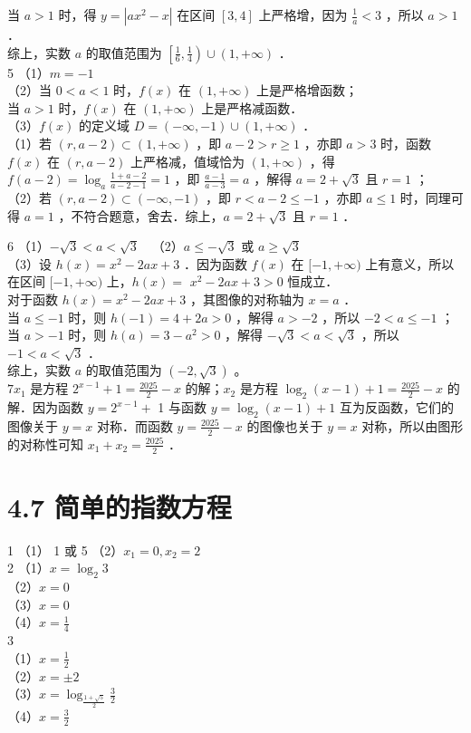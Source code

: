 \documentclass[10pt]{article}
\begin{document}
当 \(a>1\) 时，得 \(y=\left|a x^{2}-x\right|\) 在区间 \([3,4]\) 上严格增，因为 \(\frac{1}{a}<3\) ，所以 \(a>1\) ．\\
综上，实数 \(a\) 的取值范围为 \(\left[\frac{1}{6}, \frac{1}{4}\right) \cup(1,+\infty)\) ．\\
5 （1）\(m=-1\)\\
（2）当 \(0<a<1\) 时，\(f(x)\) 在 \((1,+\infty)\) 上是严格增函数；\\
当 \(a>1\) 时，\(f(x)\) 在 \((1,+\infty)\) 上是严格减函数．\\
（3）\(f(x)\) 的定义域 \(D=(-\infty,-1) \cup(1,+\infty)\) ．\\
（1）若 \((r, a-2) \subset(1,+\infty)\) ，即 \(a-2>r \geqslant 1\) ，亦即 \(a>3\) 时，函数 \(f(x)\) 在 \((r, a-2)\) 上严格减，值域恰为 \((1,+\infty)\) ，得 \(f(a-2)=\log _{a} \frac{1+a-2}{a-2-1}=1\) ，即 \(\frac{a-1}{a-3}=a\) ，解得 \(a=2+\sqrt{3}\) 且 \(r=1\) ；\\
（2）若 \((r, a-2) \subset(-\infty,-1)\) ，即 \(r<a-2 \leqslant-1\) ，亦即 \(a \leqslant 1\) 时，同理可得 \(a=1\) ，不符合题意，舍去．综上，\(a=2+\sqrt{3}\) 且 \(r=1\) ．

6 （1）\(-\sqrt{3}<a<\sqrt{3} \quad\)（2）\(a \leqslant-\sqrt{3}\) 或 \(a \geqslant \sqrt{3}\)\\
（3）设 \(h(x)=x^{2}-2 a x+3\) ．因为函数 \(f(x)\) 在 \([-1,+\infty)\) 上有意义，所以在区间 \([-1,+\infty)\) 上，\(h(x)=\) \(x^{2}-2 a x+3>0\) 恒成立．\\
对于函数 \(h(x)=x^{2}-2 a x+3\) ，其图像的对称轴为 \(x=a\) ．\\
当 \(a \leqslant-1\) 时，则 \(h(-1)=4+2 a>0\) ，解得 \(a>-2\) ，所以 \(-2<a \leqslant-1\) ；\\
当 \(a>-1\) 时，则 \(h(a)=3-a^{2}>0\) ，解得 \(-\sqrt{3}<a<\sqrt{3}\) ，所以 \(-1<a<\sqrt{3}\) ．\\
综上，实数 \(a\) 的取值范围为 \((-2, \sqrt{3})\) 。\\
\(7 x_{1}\) 是方程 \(2^{x-1}+1=\frac{2025}{2}-x\) 的解；\(x_{2}\) 是方程 \(\log _{2}(x-1)+1=\frac{2025}{2}-x\) 的解．因为函数 \(y=2^{x-1}+\) 1 与函数 \(y=\log _{2}(x-1)+1\) 互为反函数，它们的图像关于 \(y=x\) 对称．而函数 \(y=\frac{2025}{2}-x\) 的图像也关于 \(y=x\) 对称，所以由图形的对称性可知 \(x_{1}+x_{2}=\frac{2025}{2}\) ．

\section*{4.7 简单的指数方程}
1 （1） 1 或 5 （2）\(x_{1}=0, x_{2}=2\)\\
2 （1）\(x=\log _{2} 3\)\\
（2）\(x=0\)\\
（3）\(x=0\)\\
（4）\(x=\frac{1}{4}\)\\
3\\
（1）\(x=\frac{1}{2}\)\\
（2）\(x= \pm 2\)\\
（3）\(x=\log _{\frac{1+\sqrt{5}}{2}} \frac{3}{2}\)\\
（4）\(x=\frac{3}{2}\)
\end{document}
